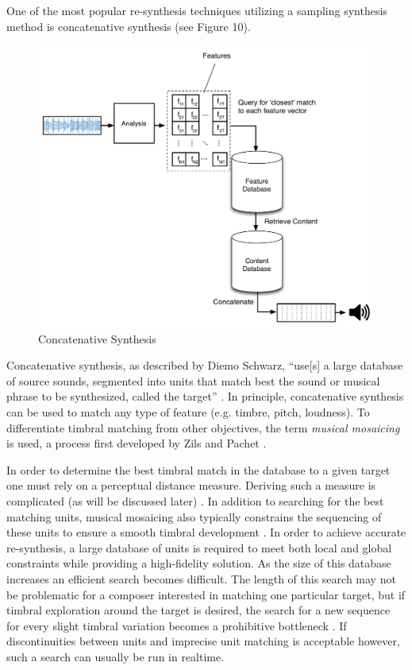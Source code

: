 \documentclass[12pt]{report} 	%
\numberwithin{figure}{chapter}
\numberwithin{table}{chapter}
\numberwithin{equation}{chapter}
\begin{document}
\begin{flushleft}
One of the most popular re-synthesis techniques utilizing a sampling synthesis method is concatenative synthesis (see Figure 10). 
\begin{figure}[h!]
\begin{center}
\includegraphics[scale=0.55]{ConcatSynth}
\caption[Concatenative synthesis]{Concatenative Synthesis}
\end{center}
\end{figure}
Concatenative synthesis, as described by Diemo Schwarz, ``use[s] a large database of source sounds, segmented into units that match best the sound or musical phrase to be synthesized, called the target'' \cite[p. 1]{Schwarz:2006gr}. In principle, concatenative synthesis can be used to match any type of feature (e.g. timbre, pitch, loudness). To differentiate timbral matching from other objectives, the term \textit{musical mosaicing} is used, a process first developed by Zils and Pachet \cite{Zils:2001bd}. 

In order to determine the best timbral match in the database to a given target one must rely on a perceptual distance measure. Deriving such a measure is complicated (as will be discussed later) \cite[p. 13]{Schwarz:2006gr}. In addition to searching for the best matching units, musical mosaicing also typically constrains the sequencing of these units to ensure a smooth timbral development \cite[p. 1]{Zils:2001bd}. In order to achieve accurate re-synthesis, a large database of units is required to meet both local and global constraints while providing a high-fidelity solution. As the size of this database increases an efficient search becomes difficult. The length of this search may not be problematic for a composer interested in matching one particular target, but if timbral exploration around the target is desired, the search for a new sequence for every slight timbral variation becomes a prohibitive bottleneck \cite[p. 11]{Schwarz:2006gr}.  If discontinuities between units and imprecise unit matching is acceptable however, such a search can usually be run in realtime.


\end{flushleft}
\end{document}

